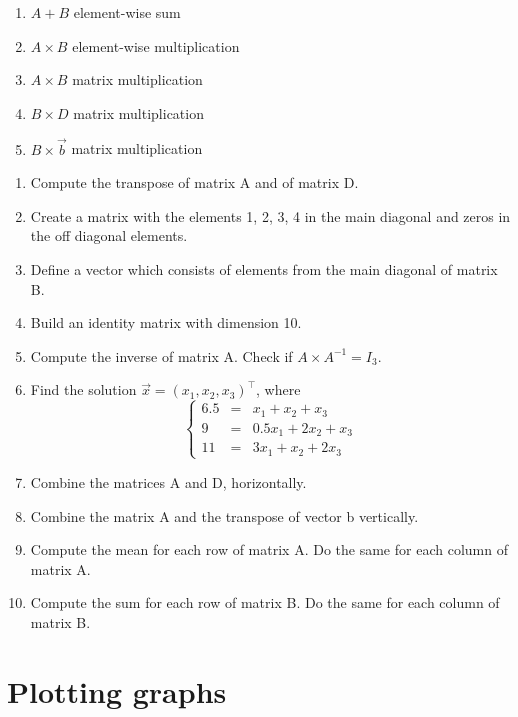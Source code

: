 \documentclass[
]{book}
\providecommand{\tightlist}{%
  \setlength{\itemsep}{0pt}\setlength{\parskip}{0pt}}
\theoremstyle{definition}
\theoremstyle{definition}
\theoremstyle{definition}
\theoremstyle{definition}
\theoremstyle{remark}
\begin{document}
\begin{enumerate}
\def\labelenumi{\roman{enumi}.}
\tightlist
\item
  \(A + B\) element-wise sum
\item
  \(A \times B\) element-wise multiplication
\item
  \(A \times B\) matrix multiplication
\item
  \(B \times D\) matrix multiplication
\item
  \(B \times \vec{b}\) matrix multiplication
\end{enumerate}

\begin{enumerate}
\def\labelenumi{\arabic{enumi}.}
\setcounter{enumi}{1}
\tightlist
\item
  Compute the transpose of matrix A and of matrix D.
\item
  Create a matrix with the elements 1, 2, 3, 4 in the main diagonal and zeros in the off diagonal elements.
\item
  Define a vector which consists of elements from the main diagonal of matrix B.
\item
  Build an identity matrix with dimension 10.
\item
  Compute the inverse of matrix A. Check if \(A \times A^{-1}=I_3\).
\item
  Find the solution \(\vec{x} = (x_1, x_2, x_3)^\top\), where
  \[
  \left\{ \begin{array}{ccl}
  6.5 &=& x_1 + x_2 + x_3 \\
  9   &=& 0.5 x_1 + 2 x_2 + x_3\\
  11  &=& 3 x_1 + x_2 + 2 x_3 \end{array}\right.
  \]
\item
  Combine the matrices A and D, horizontally.
\item
  Combine the matrix A and the transpose of vector b vertically.
\item
  Compute the mean for each row of matrix A. Do the same for each column of matrix A.
\item
  Compute the sum for each row of matrix B. Do the same for each column of matrix B.
\end{enumerate}

\hypertarget{plotting-graphs}{%
\section{Plotting graphs}\label{plotting-graphs}}
\end{document}
